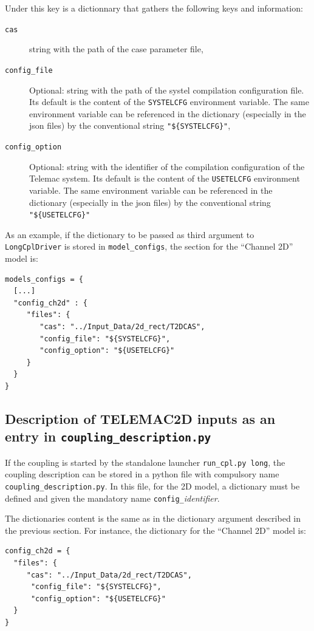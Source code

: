 \documentclass[Coupling]{../../data/TelemacDoc} %
\begin{document}
Under this key is a dictionnary that gathers the following keys and information:
\begin{description}
\item[\texttt{cas}] string with the path of the case parameter file,
\item[\texttt{config\_file}] Optional: string with the
  path of the systel compilation configuration file. Its default is the content of the
  \texttt{SYSTELCFG} environment variable. The same environment
  variable can be referenced in the dictionary (especially in the json
  files) by the conventional string \texttt{"\$\{SYSTELCFG\}"},
\item[\texttt{config\_option}] Optional: string with the identifier of
  the compilation configuration of the Telemac system. Its default is the content of the
  \texttt{USETELCFG} environment variable. The same environment
  variable can be referenced in the dictionary (especially in the json
  files) by the conventional string \texttt{"\$\{USETELCFG\}"}
\end{description}

As an example, if the dictionary to be passed as third argument to
\texttt{LongCplDriver} is stored in \texttt{model\_configs}, the
section for the ``Channel 2D'' model is:
\begin{verbatim}
models_configs = {
  [...]
  "config_ch2d" : {
     "files": {
        "cas": "../Input_Data/2d_rect/T2DCAS",
        "config_file": "${SYSTELCFG}",
        "config_option": "${USETELCFG}"
     }
  }
}
\end{verbatim}

\subsection{Description of TELEMAC2D inputs as an entry in \texttt{coupling\_description.py}}
If the coupling is started by the standalone launcher
\texttt{run\_cpl.py long}, the coupling description can be stored in
a python file with compulsory name  \texttt{coupling\_description.py}.  In this file, 
for the 2D model, a dictionary must be defined and given the mandatory name
\texttt{config\_}{\em identifier}.

The dictionaries content is the same as in the dictionary argument described in
the previous section. For instance, the dictionary for the ``Channel 2D'' model is:

\begin{verbatim}
config_ch2d = {
  "files": {
     "cas": "../Input_Data/2d_rect/T2DCAS",
      "config_file": "${SYSTELCFG}",
      "config_option": "${USETELCFG}"
  }
}
\end{verbatim}
\end{document}
